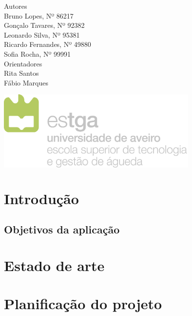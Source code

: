 \documentclass[11pt, twoside]{report}
\begin{document}
\begin{titlepage}
		
		
		\large
		Autores\\
		Bruno Lopes, Nº 86217 \\
		Gonçalo Tavares, Nº 92382  \\
		Leonardo Silva, Nº 95381 \\
		Ricardo Fernandes, Nº 49880  \\
		Sofia Rocha, Nº 99991 \\
		
		\vspace{1cm}
		Orientadores\\
		Rita Santos \\
		Fábio Marques\\
		\vspace{4cm}
		
		\centering
		\includegraphics[width=10cm]{image/AssB_vertical_cor}
		
	\end{titlepage}

	\newpage
	\setcounter{page}{1} %
	\tableofcontents %
	\thispagestyle{plain} %
	\thispagestyle{empty} %
	\newpage
	\listoftables %
	\newpage
	\listoffigures %
	
	\newpage
	
	\chapter{Introdução}
	\section{Objetivos da aplicação}
	
	
	\chapter{Estado de arte}
	\chapter{Planificação do projeto}
\end{document}
